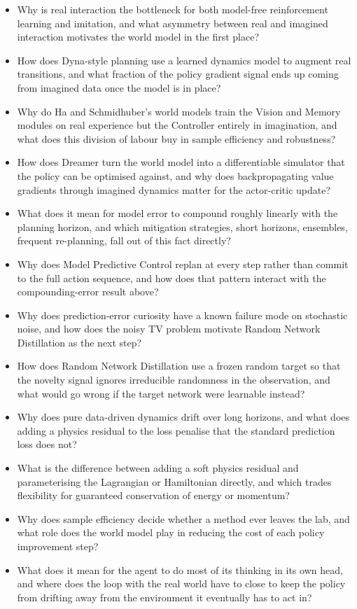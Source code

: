 \begin{itemize}
    \item Why is real interaction the bottleneck for both model-free reinforcement learning and imitation, and what asymmetry between real and imagined interaction motivates the world model in the first place?
    \item How does Dyna-style planning use a learned dynamics model to augment real transitions, and what fraction of the policy gradient signal ends up coming from imagined data once the model is in place?
    \item Why do Ha and Schmidhuber's world models train the Vision and Memory modules on real experience but the Controller entirely in imagination, and what does this division of labour buy in sample efficiency and robustness?
    \item How does Dreamer turn the world model into a differentiable simulator that the policy can be optimised against, and why does backpropagating value gradients through imagined dynamics matter for the actor-critic update?
    \item What does it mean for model error to compound roughly linearly with the planning horizon, and which mitigation strategies, short horizons, ensembles, frequent re-planning, fall out of this fact directly?
    \item Why does Model Predictive Control replan at every step rather than commit to the full action sequence, and how does that pattern interact with the compounding-error result above?
    \item Why does prediction-error curiosity have a known failure mode on stochastic noise, and how does the noisy TV problem motivate Random Network Distillation as the next step?
    \item How does Random Network Distillation use a frozen random target so that the novelty signal ignores irreducible randomness in the observation, and what would go wrong if the target network were learnable instead?
    \item Why does pure data-driven dynamics drift over long horizons, and what does adding a physics residual to the loss penalise that the standard prediction loss does not?
    \item What is the difference between adding a soft physics residual and parameterising the Lagrangian or Hamiltonian directly, and which trades flexibility for guaranteed conservation of energy or momentum?
    \item Why does sample efficiency decide whether a method ever leaves the lab, and what role does the world model play in reducing the cost of each policy improvement step?
    \item What does it mean for the agent to do most of its thinking in its own head, and where does the loop with the real world have to close to keep the policy from drifting away from the environment it eventually has to act in?
\end{itemize}


